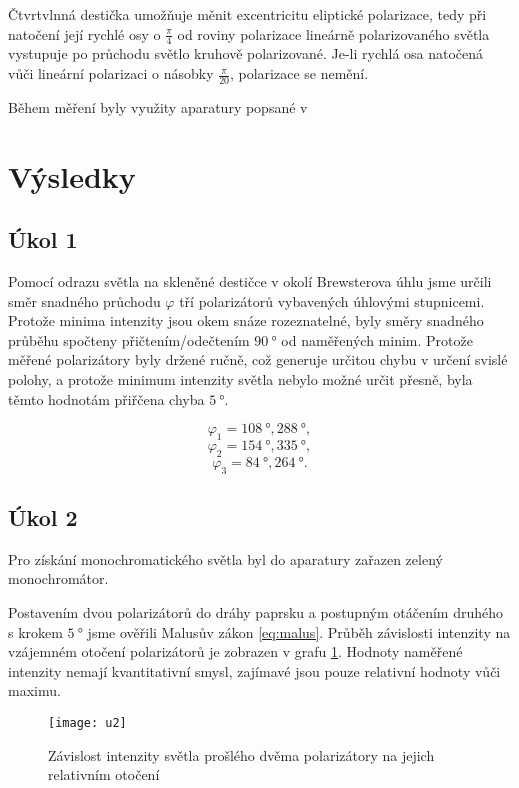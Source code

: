 \documentclass{protokol}
\begin{document}
    Čtvrtvlnná destička umožňuje měnit excentricitu eliptické polarizace, tedy při natočení její rychlé osy o $\frac{\pi}{4}$ od roviny polarizace lineárně polarizovaného světla vystupuje po průchodu světlo kruhově polarizované. Je-li rychlá osa natočená vůči lineární polarizaci o násobky $\frac{\pi}{20}$, polarizace se nemění.

    Během měření byly využity aparatury popsané v \cite{pokyny}

  \section*{Výsledky}

    \subsection*{Úkol 1}

      Pomocí odrazu světla na skleněné destičce v okolí Brewsterova úhlu jsme určili směr snadného průchodu $\varphi$ tří polarizátorů vybavených úhlovými stupnicemi. Protože minima intenzity jsou okem snáze rozeznatelné, byly směry snadného průběhu spočteny přičtením/odečtením $\SI{90}{\degree}$ od naměřených minim. Protože měřené polarizátory byly držené ručně, což generuje určitou chybu v určení svislé polohy, a protože minimum intenzity světla nebylo možné určit přesně, byla těmto hodnotám přiřčena chyba $\SI{5}{\degree}$.

      $$ \varphi_1 = \SI{108}{\degree}, \SI{288}{\degree}, $$
      $$ \varphi_2 = \SI{154}{\degree}, \SI{335}{\degree}, $$
      $$ \varphi_3 = \SI{84}{\degree}, \SI{264}{\degree}. $$

    \subsection*{Úkol 2}

      Pro získání monochromatického světla byl do aparatury zařazen zelený monochromátor. 

      Postavením dvou polarizátorů do dráhy paprsku a postupným otáčením druhého s krokem $\SI{5}{\degree}$ jsme ověřili Malusův zákon \eqref{eq:malus}. Průběh závislosti intenzity na vzájemném otočení polarizátorů je zobrazen v grafu \ref{fig:u2}. Hodnoty naměřené intenzity nemají kvantitativní smysl, zajímavé jsou pouze relativní hodnoty vůči maximu.

      \begin{figure}[H]
        \centering
        \texttt{[image: u2]}
        \caption{Závislost intenzity světla prošlého dvěma polarizátory na jejich relativním otočení}
        \label{fig:u2}
      \end{figure}
\end{document}

